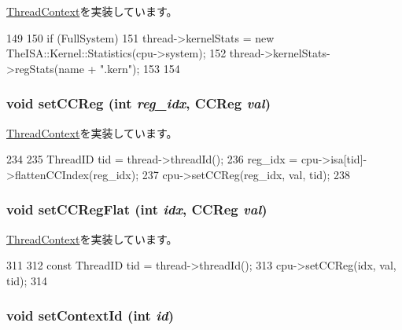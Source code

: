 \hyperlink{classThreadContext_a6450b5fad5603ec545c4bf5ff01e0646}{ThreadContext}を実装しています。


\begin{DoxyCode}
149 {
150     if (FullSystem) {
151         thread->kernelStats = new TheISA::Kernel::Statistics(cpu->system);
152         thread->kernelStats->regStats(name + ".kern");
153     }
154 }
\end{DoxyCode}
\hypertarget{classInOrderThreadContext_afd6c42b1888ad21a4382078ca7a86d09}{
\subsubsection[{setCCReg}]{\setlength{\rightskip}{0pt plus 5cm}void setCCReg (int {\em reg\_\-idx}, \/  {\bf CCReg} {\em val})}}
\label{classInOrderThreadContext_afd6c42b1888ad21a4382078ca7a86d09}


\hyperlink{classThreadContext_a276736f0c1f99f27ed95348979e8b8c6}{ThreadContext}を実装しています。


\begin{DoxyCode}
234 {
235     ThreadID tid = thread->threadId();
236     reg_idx = cpu->isa[tid]->flattenCCIndex(reg_idx);
237     cpu->setCCReg(reg_idx, val, tid);
238 }
\end{DoxyCode}
\hypertarget{classInOrderThreadContext_a6dec2284dd5904f992642f24bb289f14}{
\subsubsection[{setCCRegFlat}]{\setlength{\rightskip}{0pt plus 5cm}void setCCRegFlat (int {\em idx}, \/  {\bf CCReg} {\em val})}}
\label{classInOrderThreadContext_a6dec2284dd5904f992642f24bb289f14}


\hyperlink{classThreadContext_ab1028831649236bd6f229a4561663fd9}{ThreadContext}を実装しています。


\begin{DoxyCode}
311 {
312     const ThreadID tid = thread->threadId();
313     cpu->setCCReg(idx, val, tid);
314 }
\end{DoxyCode}
\hypertarget{classInOrderThreadContext_a0dd10037a5b0eadaddfe7c67d52d3ac6}{
\subsubsection[{setContextId}]{\setlength{\rightskip}{0pt plus 5cm}void setContextId (int {\em id})}}
\label{classInOrderThreadContext_a0dd10037a5b0eadaddfe7c67d52d3ac6}


